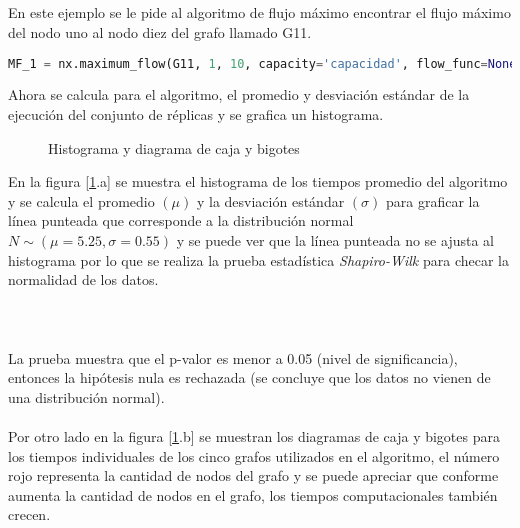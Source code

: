 \documentclass[a4paper, 11pt]{article}
\begin{document}
\subsection*{}

En este ejemplo se le pide al algoritmo de flujo máximo encontrar el flujo máximo del nodo uno al nodo diez del grafo llamado G11.
\begin{lstlisting}[language=Python]
 MF_1 = nx.maximum_flow(G11, 1, 10, capacity='capacidad', flow_func=None)
\end{lstlisting}

Ahora se calcula para el algoritmo, el promedio y desviación estándar de la ejecución del conjunto de réplicas y se grafica un histograma.

\begin{figure}[H]
\centering
{}
\caption{Histograma y diagrama de caja y bigotes} \label{figure6}
\end{figure}

En la figura [\ref{figure6}.a] se muestra el histograma de los tiempos promedio del algoritmo y se calcula el promedio $(\mu)$ y la desviación estándar $(\sigma)$ para graficar la línea punteada que corresponde a la distribución normal $N\sim(\mu=5.25, \sigma=0.55)$ y se puede ver que la línea punteada no se ajusta al histograma por lo que se realiza la prueba estadística \textit{Shapiro-Wilk} para checar la normalidad de los datos.
\\
\\
\noindent{}
\\
\\
La prueba muestra que el p-valor es menor a 0.05 (nivel de significancia), entonces la hipótesis nula es rechazada (se concluye que los datos no vienen de una distribución normal).
\\
\\
Por otro lado en la figura [\ref{figure6}.b] se muestran los diagramas de caja y bigotes para los tiempos individuales de los cinco grafos utilizados en el algoritmo, el número rojo representa la cantidad de nodos del grafo y se puede apreciar que conforme aumenta la cantidad de nodos en el grafo, los tiempos computacionales también crecen.
\end{document}
